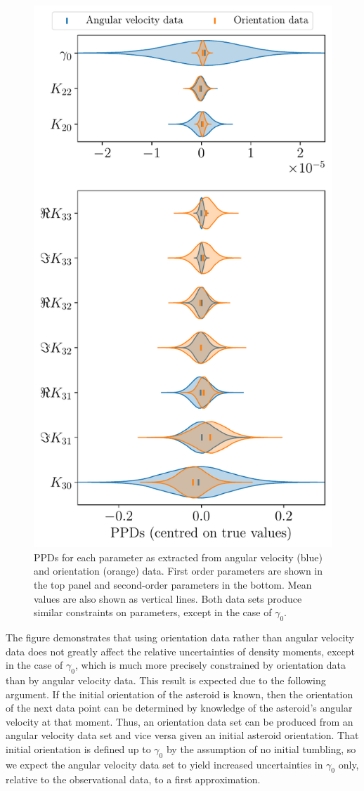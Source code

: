 \documentclass[9pt,twocolumn]{article}
\numberwithin{equation}{section}
\begin{document}
\begin{figure}
  \centering
  \includegraphics[width=0.7\linewidth]{figs/orientation-unc}
  \caption{PPDs for each parameter as extracted from angular velocity (blue) and orientation (orange) data. First order parameters are shown in the top panel and second-order parameters in the bottom. Mean values are also shown as vertical lines. Both data sets produce similar constraints on parameters, except in the case of $\gamma_0$.}
  \label{fig:orientation-unc}
\end{figure}

The figure demonstrates that using orientation data rather than angular velocity data does not greatly affect the relative uncertainties of density moments, except in the case of $\gamma_0$, which is much more precisely constrained by orientation data than by angular velocity data. This result is expected due to the following argument. If the initial orientation of the asteroid is known, then the orientation of the next data point can be determined by knowledge of the asteroid's angular velocity at that moment. Thus, an orientation data set can be produced from an angular velocity data set and vice versa given an initial asteroid orientation. That initial orientation is defined up to $\gamma_0$ by the assumption of no initial tumbling, so we expect the angular velocity data set to yield increased uncertainties in $\gamma_0$ only, relative to the observational data, to a first approximation.
\end{document}
